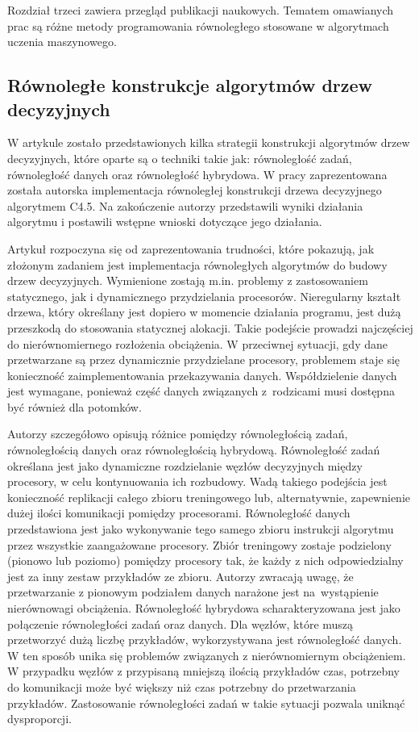 \documentclass[12pt]{article}
\begin{document}
Rozdział trzeci zawiera przegląd publikacji naukowych. Tematem omawianych prac są różne metody programowania równoległego stosowane
w algorytmach uczenia maszynowego.

\subsection{Równoległe konstrukcje algorytmów drzew decyzyjnych}

W artykule \cite{parallel-implementation-decision-tree} zostało przedstawionych kilka strategii konstrukcji algorytmów drzew decyzyjnych, które oparte są o techniki takie jak: równoległość zadań,
równoległość danych oraz równoległość hybrydowa. W pracy zaprezentowana została autorska implementacja równoległej konstrukcji drzewa
decyzyjnego algorytmem C4.5. Na zakończenie autorzy przedstawili wyniki działania algorytmu i postawili wstępne wnioski dotyczące jego działania.

Artykuł rozpoczyna się od zaprezentowania trudności, które pokazują, jak złożonym zadaniem jest implementacja równoległych
algorytmów do budowy drzew decyzyjnych. Wymienione zostają m.in. problemy z zastosowaniem statycznego, jak i dynamicznego przydzielania procesorów.
Nieregularny kształt drzewa, który określany jest dopiero w momencie działania programu, jest dużą przeszkodą do stosowania statycznej alokacji. Takie podejście prowadzi
najczęściej do nierównomiernego rozłożenia obciążenia. W przeciwnej sytuacji, gdy dane przetwarzane są przez dynamicznie przydzielane procesory, problemem staje się
konieczność zaimplementowania przekazywania danych. Współdzielenie danych jest wymagane, ponieważ część danych związanych z~rodzicami musi dostępna być również dla potomków.

Autorzy szczegółowo opisują różnice pomiędzy równoległością zadań, równoległością danych oraz równoległością hybrydową. Równoległość zadań określana jest
jako dynamiczne rozdzielanie węzłów decyzyjnych między procesory, w celu kontynuowania ich rozbudowy. Wadą takiego podejścia jest konieczność replikacji całego zbioru
treningowego lub, alternatywnie, zapewnienie dużej ilości komunikacji pomiędzy procesorami. Równoległość danych przedstawiona jest jako wykonywanie tego samego zbioru instrukcji
algorytmu przez wszystkie zaangażowane procesory. Zbiór treningowy zostaje podzielony (pionowo lub poziomo) pomiędzy procesory tak, że każdy z nich odpowiedzialny jest za
inny zestaw przykładów ze zbioru. Autorzy zwracają uwagę, że przetwarzanie z pionowym podziałem danych narażone jest na~wystąpienie nierównowagi obciążenia.
Równoległość hybrydowa scharakteryzowana jest jako połączenie równoległości zadań oraz danych. Dla węzłów, które muszą przetworzyć dużą liczbę przykładów, wykorzystywana
jest równoległość danych. W ten sposób unika się problemów związanych z nierównomiernym obciążeniem. W przypadku węzłów z przypisaną mniejszą ilością przykładów
czas, potrzebny do komunikacji może być większy niż czas potrzebny do przetwarzania przykładów. Zastosowanie równoległości zadań w takie sytuacji pozwala uniknąć dysproporcji.
\end{document}
